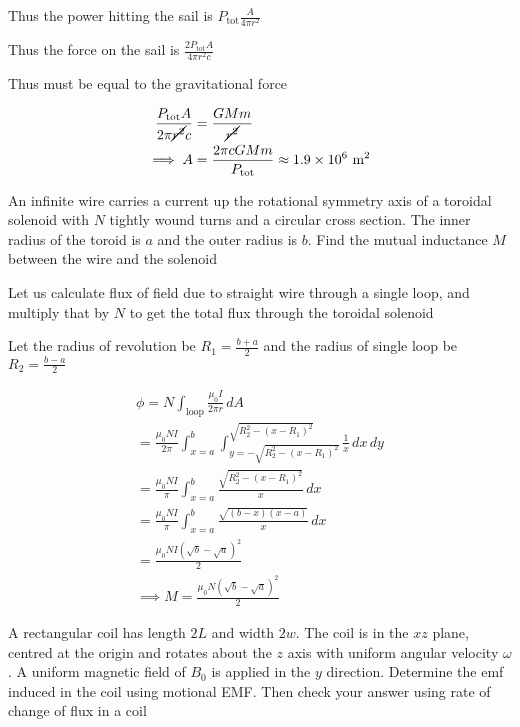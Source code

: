 \documentclass[../main.tex]{subfiles}
\begin{document}
\begin{questions}
\begin{solution}
	Thus the power hitting the sail is $P_\text{tot}\frac{A}{4\pi r^2}$
	
	Thus the force on the sail is $\frac{2P_\text{tot}A}{4\pi r^2c}$

	Thus must be equal to the gravitational force

	\begin{align}
		\frac{P_\text{tot}A}{2\pi \cancel{r^2}c} &= \frac{GMm}{\cancel{r^2}}
		\\
		\implies A &= \frac{2\pi cGMm}{P_\text{tot}} \approx 1.9\times 10^6\ \text{m$^2$} 
	\end{align}
\end{solution}

\question An infinite wire carries a current up the rotational symmetry axis of a toroidal solenoid with $N$ tightly wound turns and a circular cross section. The inner radius of the toroid is $a$ and the outer radius is $b$. Find the mutual inductance $M$ between the wire and the solenoid
\begin{solution}
	Let us calculate flux of field due to straight wire through a single loop, and multiply that by $N$ to get the total flux through the toroidal solenoid

	Let the radius of revolution be $R_1=\frac{b+a}{2}$ and the radius of single loop be $R_2=\frac{b-a}{2}$

	\begin{gather}
		\phi = N\int_\text{loop}\frac{\mu_0I}{2\pi r}\,dA
		\\
		= \frac{\mu_0NI}{2\pi}\int_{x=a}^{b}\int^{\sqrt{R_2^2-(x-R_1)^2}}_{y=-\sqrt{R_2^2-(x-R_1)^2}} \frac{1}{x}\,dx\,dy
		\\
		= \frac{\mu_0NI}{\pi}\int_{x=a}^{b}\frac{\sqrt{R_2^2-(x-R_1)^2}}{x}\,dx
		\\
		= \frac{\mu_0NI}{\pi}\int_{x=a}^{b} \frac{\sqrt{(b-x)(x-a)}}{x}\,dx
		\\
		= \frac{\mu_0NI(\sqrt{b}-\sqrt{a})^2}{2}
		\\
		\implies M = \frac{\mu_0N(\sqrt{b}-\sqrt{a})^2}{2}
	\end{gather}
\end{solution}

\question A rectangular coil has length $2L$ and width $2w$. The coil is in the $xz$ plane, centred at the origin and rotates about the $z$ axis with uniform angular velocity $\omega$. A uniform magnetic field of $B_0$ is applied in the $y$ direction. Determine the emf induced in the coil using motional EMF. Then check your answer using rate of change of flux in a coil


\end{questions}
\end{document}
